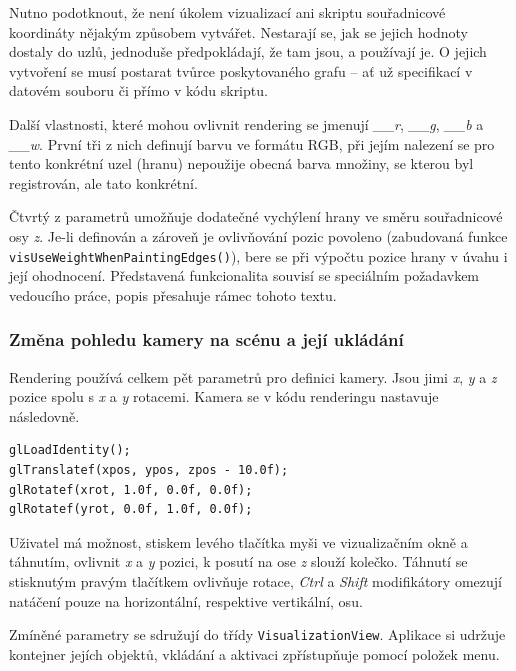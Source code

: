 \documentclass[11pt,twoside,a4paper]{book}
\begin{document}
Nutno podotknout, že není úkolem vizualizací ani skriptu souřadnicové koordináty nějakým způsobem vytvářet. Nestarají se, jak se jejich hodnoty dostaly do uzlů, jednoduše před\-po\-klá\-da\-jí, že tam jsou, a používají je. O jejich vytvoření se musí postarat tvůrce poskytovaného grafu -- ať už specifikací v datovém souboru či přímo v kódu skriptu.

Další vlastnosti, které mohou ovlivnit rendering se jmenují \textit{\_\_r}, \textit{\_\_g}, \textit{\_\_b} a \textit{\_\_w}. První tři z nich definují barvu ve formátu RGB, při jejím nalezení se pro tento konkrétní uzel (hranu) nepoužije obecná barva množiny, se kterou byl registrován, ale tato konkrétní.

Čtvrtý z parametrů umožňuje dodatečné vychýlení hrany ve směru souřadnicové osy \textit{z}. Je-li definován a zároveň je ovlivňování pozic povoleno (zabudovaná funkce \texttt{vis\-Use\-Weight\-When\-Pa\-in\-ting\-Ed\-ges()}), bere se při výpočtu pozice hrany v úvahu i její ohodnocení. Představená funkcionalita souvisí se speciálním požadavkem vedoucího práce, popis přesahuje rámec tohoto textu.


\subsubsection{Změna pohledu kamery na scénu a její ukládání}

Rendering používá celkem pět parametrů pro definici kamery. Jsou jimi \textit{x}, \textit{y} a \textit{z} pozice spolu s \textit{x} a \textit{y} rotacemi. Kamera se v kódu renderingu nastavuje následovně.

\begin{verbatim}
glLoadIdentity();
glTranslatef(xpos, ypos, zpos - 10.0f);
glRotatef(xrot, 1.0f, 0.0f, 0.0f);
glRotatef(yrot, 0.0f, 1.0f, 0.0f);
\end{verbatim}

Uživatel má možnost, stiskem levého tlačítka myši ve vizualizačním okně a táhnutím, ovlivnit \textit{x} a \textit{y} pozici, k posutí na ose \textit{z} slouží kolečko. Táhnutí se stisknutým pravým tlačítkem ovlivňuje rotace, \textit{Ctrl} a \textit{Shift} modifikátory omezují natáčení pouze na horizontální, respektive vertikální, osu.

Zmíněné parametry se sdružují do třídy \texttt{VisualizationView}. Aplikace si udržuje kontejner jejích objektů, vkládání a aktivaci zpřístupňuje pomocí položek menu.
\end{document}
